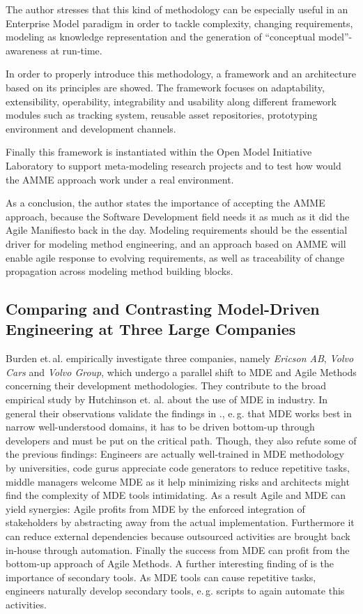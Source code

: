\documentclass[10pt, a4paper, twocolumn]{article}
\begin{document}
The author stresses that this kind of methodology can be especially useful in an Enterprise Model paradigm in order to tackle complexity, changing requirements, modeling as knowledge representation and the generation of “conceptual model”-awareness at run-time.

In order to properly introduce this methodology, a framework and an architecture based on its principles are showed. The framework focuses on adaptability, extensibility, operability, integrability and usability along different framework modules such as tracking system, reusable asset repositories, prototyping environment and development channels. 

Finally this framework is instantiated within the Open Model Initiative Laboratory to support meta-modeling research projects and to test how would the AMME approach work under a real environment. 

As a conclusion, the author states the importance of accepting the AMME approach, because the Software Development field needs it as much as it did the Agile Manifiesto back in the day. Modeling
requirements should be the essential driver for modeling method engineering, and an approach based on AMME will enable agile response to evolving requirements, as well as traceability of change propagation across modeling method building blocks.

\subsection{Comparing and Contrasting Model-Driven Engineering at Three Large Companies}

Burden et.\,al. \cite{10} empirically investigate three companies, namely \emph{Ericson AB}, \emph{Volvo Cars} and \emph{Volvo Group}, which undergo a parallel shift to MDE and Agile Methods concerning their development methodologies.
They contribute to the broad empirical study by Hutchinson et. al. \cite{secondaryHutchinsonEmpirical} about the use of MDE in industry.
In general their observations validate the findings in \cite{secondaryHutchinsonEmpirical}., e.\,g. that MDE works best in narrow well-understood domains, it has to be driven bottom-up through developers and must be put on the critical path.
Though, they also refute some of the previous findings: 
Engineers are actually well-trained in MDE methodology by universities, code gurus appreciate code generators to reduce repetitive tasks, middle managers welcome MDE as it help minimizing risks and architects might find the complexity of MDE tools intimidating.
As a result Agile and MDE can yield synergies:
Agile profits from MDE by the enforced integration of stakeholders by abstracting away from the actual implementation. Furthermore it can reduce external dependencies because outsourced activities are brought back in-house through automation.
Finally the success from MDE can profit from the bottom-up approach of Agile Methods.
A further interesting finding of \cite{10} is the importance of secondary tools. 
As MDE tools can cause repetitive tasks, engineers naturally develop secondary tools, e.\,g. scripts to again automate this activities.
\end{document}
